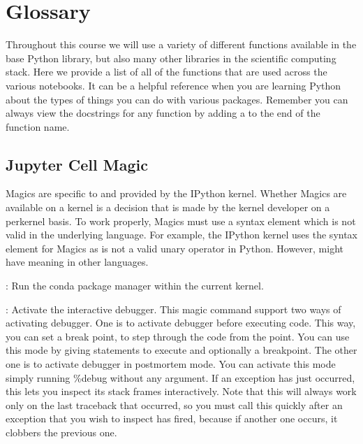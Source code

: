 \documentclass[letterpaper,10pt,english]{sphinxmanual}
\begin{document}


\section{Glossary}
\label{\detokenize{content/Glossary:glossary}}\label{\detokenize{content/Glossary::doc}}

Throughout this course we will use a variety of different functions available in the base Python library, but also many other libraries in the scientific computing stack. Here we provide a list of all of the functions that are used across the various notebooks. It can be a helpful reference when you are learning Python about the types of things you can do with various packages. Remember you can always view the docstrings for any function by adding a  to the end of the function name.


\subsection{Jupyter Cell Magic}
\label{\detokenize{content/Glossary:jupyter-cell-magic}}
Magics are specific to and provided by the IPython kernel. Whether Magics are available on a kernel is a decision that is made by the kernel developer on a per\sphinxhyphen{}kernel basis. To work properly, Magics must use a syntax element which is not valid in the underlying language. For example, the IPython kernel uses the \sphinxcode{\sphinxupquote{\%}} syntax element for Magics as \sphinxcode{\sphinxupquote{\%}} is not a valid unary operator in Python. However, \sphinxcode{\sphinxupquote{\%}} might have meaning in other languages.

: Run the conda package manager within the current kernel.

: Activate the interactive debugger. This magic command support two ways of activating debugger. One is to activate debugger before executing code. This way, you can set a break point, to step through the code from the point. You can use this mode by giving statements to execute and optionally a breakpoint. The other one is to activate debugger in post\sphinxhyphen{}mortem mode. You can activate this mode simply running \%debug without any argument. If an exception has just occurred, this lets you inspect its stack frames interactively. Note that this will always work only on the last traceback that occurred, so you must call this quickly after an exception that you wish to inspect has fired, because if another one occurs, it clobbers the previous one.
\end{document}
